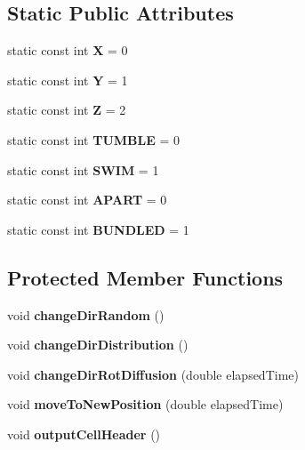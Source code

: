 \subsection*{Static Public Attributes}
\begin{CompactItemize}
\item 
static const int {\bf X} = 0
\item 
static const int {\bf Y} = 1
\item 
static const int {\bf Z} = 2
\item 
static const int {\bf TUMBLE} = 0
\item 
static const int {\bf SWIM} = 1
\item 
static const int {\bf APART} = 0
\item 
static const int {\bf BUNDLED} = 1
\end{CompactItemize}
\subsection*{Protected Member Functions}
\begin{CompactItemize}
\item 
void {\bf changeDirRandom} ()
\item 
void {\bf changeDirDistribution} ()
\item 
void {\bf changeDirRotDiffusion} (double elapsedTime)
\item 
void {\bf moveToNewPosition} (double elapsedTime)
\item 
void {\bf outputCellHeader} ()
\end{CompactItemize}
